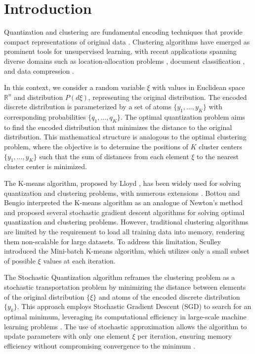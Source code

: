 \section{Introduction}

Quantization and clustering are fundamental encoding techniques that provide compact representations of original data \cite{Graf_Luschgy_2000,Jain_2010,Scholkopf_Smola_2002}. Clustering algorithms have emerged as prominent tools for unsupervised learning, with recent applications spanning diverse domains such as location-allocation problems \cite{Wang_Wei_2020}, document classification \cite{Radomirovic_2023,Widodo_2011}, and data compression \cite{Wan_2019}.

In this context, we consider a random variable $\xi$ with values in Euclidean space $\mathbb{R}^n$ and distribution $P(d\xi)$, representing the original distribution. The encoded discrete distribution is parameterized by a set of atoms $\{y_1, \ldots, y_K\}$ with corresponding probabilities $\{q_1, \ldots, q_K\}$. The optimal quantization problem aims to find the encoded distribution that minimizes the distance to the original distribution. This mathematical structure is analogous to the optimal clustering problem, where the objective is to determine the positions of $K$ cluster centers $\{y_1, \ldots, y_K\}$ such that the sum of distances from each element $\xi$ to the nearest cluster center is minimized.

The K-means algorithm, proposed by Lloyd \cite{Lloyd_1982}, has been widely used for solving quantization and clustering problems, with numerous extensions \cite{Jain_2010}. Bottou and Bengio \cite{Bottou_1994} interpreted the K-means algorithm as an analogue of Newton's method and proposed several stochastic gradient descent algorithms for solving optimal quantization and clustering problems. However, traditional clustering algorithms are limited by the requirement to load all training data into memory, rendering them non-scalable for large datasets. To address this limitation, Sculley \cite{Sculley_2010} introduced the Mini-batch K-means algorithm, which utilizes only a small subset of possible $\xi$ values at each iteration.

The Stochastic Quantization algorithm reframes the clustering problem as a stochastic transportation problem \cite{Kuzmenko_Uryasev_2019,Lakshmanan_Pichler_2023} by minimizing the distance between elements of the original distribution $\{\xi\}$ and atoms of the encoded discrete distribution $\{y_k\}$. This approach employs Stochastic Gradient Descent (SGD) \cite{ermoliev1976stochastic,kiefer1952stochastic,Robbins_Monro_1951} to search for an optimal minimum, leveraging its computational efficiency in large-scale machine learning problems \cite{Bottou_2010}. The use of stochastic approximation allows the algorithm to update parameters with only one element $\xi$ per iteration, ensuring memory efficiency without compromising convergence to the minimum \cite{Newton_Yousefian_Pasupathy_2018}.

